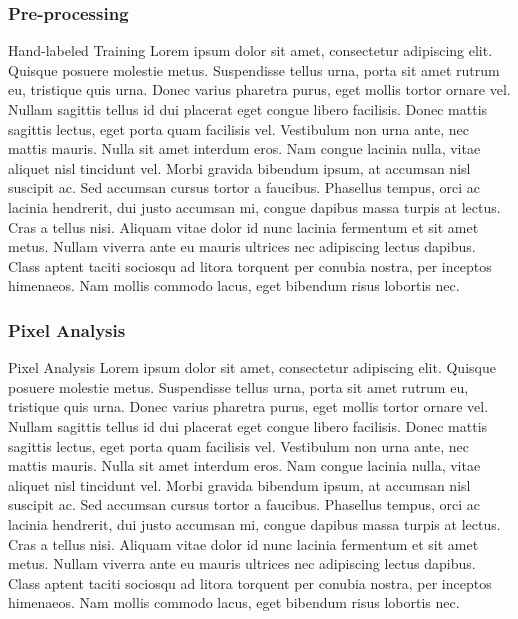 \documentclass[12pt]{article}
\begin{document}
		\subsubsection{Pre-processing}
		Hand-labeled Training
		Lorem ipsum dolor sit amet, consectetur adipiscing elit. Quisque posuere molestie metus. Suspendisse tellus urna, porta sit amet rutrum eu, tristique quis urna. Donec varius pharetra purus, eget mollis tortor ornare vel. Nullam sagittis tellus id dui placerat eget congue libero facilisis. Donec mattis sagittis lectus, eget porta quam facilisis vel. Vestibulum non urna ante, nec mattis mauris. Nulla sit amet interdum eros. Nam congue lacinia nulla, vitae aliquet nisl tincidunt vel. Morbi gravida bibendum ipsum, at accumsan nisl suscipit ac. Sed accumsan cursus tortor a faucibus. Phasellus tempus, orci ac lacinia hendrerit, dui justo accumsan mi, congue dapibus massa turpis at lectus. Cras a tellus nisi. Aliquam vitae dolor id nunc lacinia fermentum et sit amet metus. Nullam viverra ante eu mauris ultrices nec adipiscing lectus dapibus. Class aptent taciti sociosqu ad litora torquent per conubia nostra, per inceptos himenaeos. Nam mollis commodo lacus, eget bibendum risus lobortis nec.
		\subsubsection{Pixel Analysis}
		Pixel Analysis
		Lorem ipsum dolor sit amet, consectetur adipiscing elit. Quisque posuere molestie metus. Suspendisse tellus urna, porta sit amet rutrum eu, tristique quis urna. Donec varius pharetra purus, eget mollis tortor ornare vel. Nullam sagittis tellus id dui placerat eget congue libero facilisis. Donec mattis sagittis lectus, eget porta quam facilisis vel. Vestibulum non urna ante, nec mattis mauris. Nulla sit amet interdum eros. Nam congue lacinia nulla, vitae aliquet nisl tincidunt vel. Morbi gravida bibendum ipsum, at accumsan nisl suscipit ac. Sed accumsan cursus tortor a faucibus. Phasellus tempus, orci ac lacinia hendrerit, dui justo accumsan mi, congue dapibus massa turpis at lectus. Cras a tellus nisi. Aliquam vitae dolor id nunc lacinia fermentum et sit amet metus. Nullam viverra ante eu mauris ultrices nec adipiscing lectus dapibus. Class aptent taciti sociosqu ad litora torquent per conubia nostra, per inceptos himenaeos. Nam mollis commodo lacus, eget bibendum risus lobortis nec.

			
\end{document}
